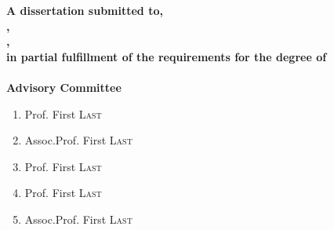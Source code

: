 \begin{titlepage}
	\begin{large}
		\null\vfill
		\centering
		\textbf{A dissertation submitted to\deptname,\\
			\facname,\\
			\univname,\\
			in partial fulfillment of the requirements for the degree of\\
			\degreename}\\[2.5cm]
		
		\textbf{Advisory Committee}\\[0.5cm]
		\begin{enumerate}
			\item Prof. First \textsc{Last}
			\\
			\item Assoc.Prof. First \textsc{Last}
			\\
			\item Prof. First \textsc{Last}
			\item Prof. First \textsc{Last}
			\item Assoc.Prof. First \textsc{Last}
		\end{enumerate}
		\null\vfill
	\end{large}
\end{titlepage}
